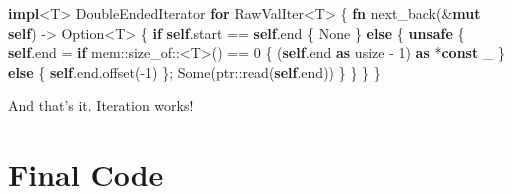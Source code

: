 \documentclass[a4paper,]{book}
\newenvironment{Shaded}{\begin{snugshade}}{\end{snugshade}}
\newcommand{\KeywordTok}[1]{\textcolor[rgb]{0.13,0.29,0.53}{\textbf{{#1}}}}
\newcommand{\DataTypeTok}[1]{\textcolor[rgb]{0.13,0.29,0.53}{{#1}}}
\newcommand{\DecValTok}[1]{\textcolor[rgb]{0.00,0.00,0.81}{{#1}}}
\newcommand{\ConstantTok}[1]{\textcolor[rgb]{0.00,0.00,0.00}{{#1}}}
\newcommand{\BuiltInTok}[1]{{#1}}
\newcommand{\NormalTok}[1]{{#1}}
\begin{document}
\begin{Shaded}
\begin{Highlighting}[]
\KeywordTok{impl}\NormalTok{<T> }\BuiltInTok{DoubleEndedIterator} \KeywordTok{for} \NormalTok{RawValIter<T> \{}
    \KeywordTok{fn} \NormalTok{next_back(&}\KeywordTok{mut} \KeywordTok{self}\NormalTok{) -> }\DataTypeTok{Option}\NormalTok{<T> \{}
        \KeywordTok{if} \KeywordTok{self}\NormalTok{.start == }\KeywordTok{self}\NormalTok{.end \{}
            \ConstantTok{None}
        \NormalTok{\} }\KeywordTok{else} \NormalTok{\{}
            \KeywordTok{unsafe} \NormalTok{\{}
                \KeywordTok{self}\NormalTok{.end = }\KeywordTok{if} \NormalTok{mem::size_of::<T>() == }\DecValTok{0} \NormalTok{\{}
                    \NormalTok{(}\KeywordTok{self}\NormalTok{.end }\KeywordTok{as} \DataTypeTok{usize} \NormalTok{- }\DecValTok{1}\NormalTok{) }\KeywordTok{as} \NormalTok{*}\KeywordTok{const} \NormalTok{_}
                \NormalTok{\} }\KeywordTok{else} \NormalTok{\{}
                    \KeywordTok{self}\NormalTok{.end.offset(-}\DecValTok{1}\NormalTok{)}
                \NormalTok{\};}
                \ConstantTok{Some}\NormalTok{(ptr::read(}\KeywordTok{self}\NormalTok{.end))}
            \NormalTok{\}}
        \NormalTok{\}}
    \NormalTok{\}}
\NormalTok{\}}
\end{Highlighting}
\end{Shaded}

And that's it. Iteration works!

\section{Final Code}\label{sec--vec-final}
\end{document}
